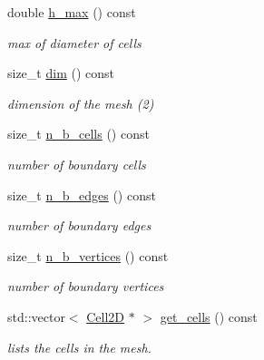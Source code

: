\begin{DoxyCompactItemize}
double \hyperlink{group__Mesh2D_gaaaa058631dc2af282237e489c5861b8b}{h\+\_\+max} () const
\begin{DoxyCompactList}\small\item\em max of diameter of cells \end{DoxyCompactList}\item 
size\+\_\+t \hyperlink{group__Mesh2D_ga0f0a5c852edbfcbf66fc84a2005fdaf2}{dim} () const
\begin{DoxyCompactList}\small\item\em dimension of the mesh (2) \end{DoxyCompactList}\item 
\mbox{\label{classHArDCore2D_1_1Mesh2D_a393805b16a24933ecc43da5d5766c381}} 
size\+\_\+t \hyperlink{classHArDCore2D_1_1Mesh2D_a393805b16a24933ecc43da5d5766c381}{n\+\_\+b\+\_\+cells} () const
\begin{DoxyCompactList}\small\item\em number of boundary cells \end{DoxyCompactList}\item 
\mbox{\label{classHArDCore2D_1_1Mesh2D_af2a2d46050a150499c1d1375a731d548}} 
size\+\_\+t \hyperlink{classHArDCore2D_1_1Mesh2D_af2a2d46050a150499c1d1375a731d548}{n\+\_\+b\+\_\+edges} () const
\begin{DoxyCompactList}\small\item\em number of boundary edges \end{DoxyCompactList}\item 
\mbox{\label{classHArDCore2D_1_1Mesh2D_a50af6c70a806781681cef7fa8a95ee58}} 
size\+\_\+t \hyperlink{classHArDCore2D_1_1Mesh2D_a50af6c70a806781681cef7fa8a95ee58}{n\+\_\+b\+\_\+vertices} () const
\begin{DoxyCompactList}\small\item\em number of boundary vertices \end{DoxyCompactList}\item 
std\+::vector$<$ \hyperlink{classHArDCore2D_1_1Cell2D}{Cell2D} $\ast$ $>$ \hyperlink{group__Mesh2D_ga2392f5bac860bec56d9f53eec9746ea5}{get\+\_\+cells} () const
\begin{DoxyCompactList}\small\item\em lists the cells in the mesh. \end{DoxyCompactList}\item 

\end{DoxyCompactItemize}
